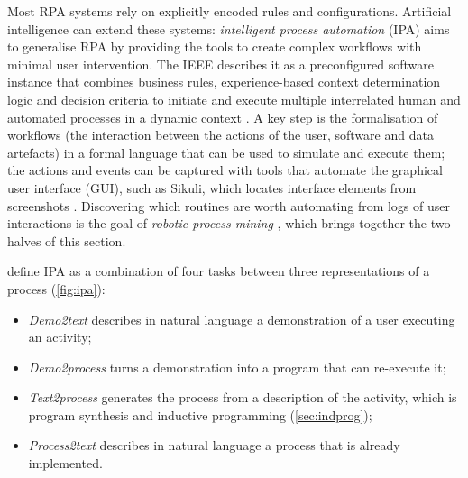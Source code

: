 Most RPA systems rely on explicitly encoded rules and configurations. Artificial intelligence
can extend these systems: \emph{intelligent process automation} (IPA) aims to generalise RPA by
providing the tools to create complex workflows with minimal user intervention. The IEEE describes it as
a preconfigured software instance that combines business rules, experience-based context determination
logic and decision criteria to initiate and execute multiple interrelated human and automated processes
in a dynamic context \citep{ieee2017ipa}. A key step is the formalisation of workflows (the interaction
between the actions of the user, software and data artefacts) in a formal language that can be used to
simulate and execute them; the actions and events can be captured with tools that automate the graphical user interface (GUI), such as
Sikuli, which locates interface elements from screenshots \citep{yeh2009sikuli}. Discovering which
routines are worth automating from logs of user interactions is the goal of \emph{robotic process
mining} \citep{leno2021robotic}, which brings together the two halves of this section.

\citet{ferreira2020evaluation} define IPA as a combination of four tasks between three representations of
a process (\cref{fig:ipa}): \begin{itemize}
\item \emph{Demo2text} describes in natural language a demonstration of a user
executing an activity; \item \emph{Demo2process} turns a demonstration into a program that can re-execute it;
\item \emph{Text2process} generates the process from a description of the activity, which is program synthesis
and inductive programming (\cref{sec:indprog}); \item \emph{Process2text} describes in natural language a
process that is already implemented.
\end{itemize}

